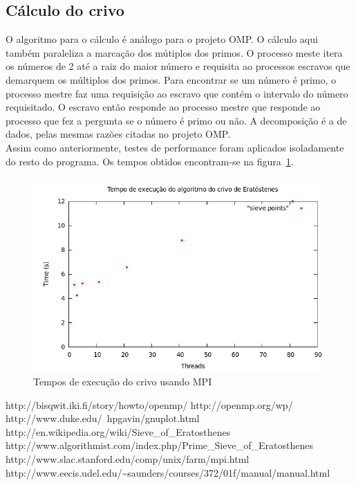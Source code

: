 \documentclass[a4paper]{article}
\begin{document}
\subsection{Cálculo do crivo}
\indent \indent O algoritmo para o cálculo é análogo para o projeto OMP. O cálculo aqui também paraleliza a marcação dos mútiplos dos primos. O processo meste itera os números de 2 até a raiz do maior número e requisita ao processos escravos que demarquem os múltiplos dos primos. Para encontrar se um número é primo, o processo mestre faz uma requisição ao escravo que contém o intervalo do número requisitado. O escravo então responde ao processo mestre que responde ao processo que fez a pergunta se o número é primo ou não. A decomposição é a de dados, pelas mesmas razões citadas no projeto OMP.\\
\indent Assim como anteriormente, testes de performance foram aplicados isoladamente do resto do programa. Os tempos obtidos encontram-se na figura~\ref{graph-sieve-mpi}.
\begin{figure}[float=p]
	\includegraphics[scale=0.5]{graph-sieve-mpi}
	\caption{Tempos de execução do crivo usando MPI}
	\label{graph-sieve-mpi}
\end{figure}

\newpage
\begin{thebibliography}{99}
	http://bisqwit.iki.fi/story/howto/openmp/
	http://openmp.org/wp/
	http://www.duke.edu/~hpgavin/gnuplot.html
	 http://en.wikipedia.org/wiki/Sieve\_of\_Eratosthenes
	 http://www.algorithmist.com/index.php/Prime\_Sieve\_of\_Eratosthenes
	 http://www.slac.stanford.edu/comp/unix/farm/mpi.html
	 http://www.eecis.udel.edu/\~{}saunders/courses/372/01f/manual/manual.html
\end{thebibliography}
\end{document}
